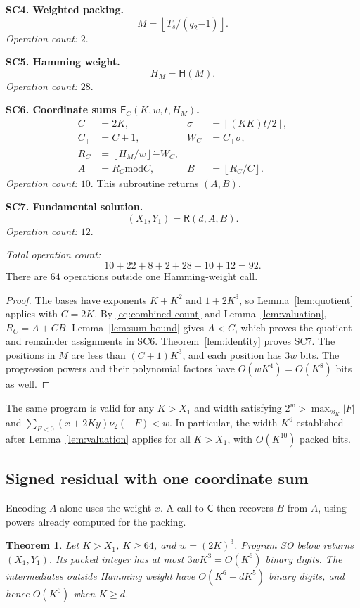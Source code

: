 \documentclass[11pt]{article}
\newtheorem{theorem}{Theorem}
\theoremstyle{remark}
\newcommand{\tsub}{\mathbin{\dot{-}}}
\newcommand{\md}{\mathbin{\mathrm{mod}}}
\newcommand{\fl}[1]{\left\lfloor #1\right\rfloor}
\newcommand{\Recover}{\mathsf{R}}
\newcommand{\Coord}{\mathsf{C}}
\begin{document}
\textbf{SC4. Weighted packing.}
\[
  M=\fl{T_s/(q_2\tsub1)}.
\]
\emph{Operation count:} $2$.

\textbf{SC5. Hamming weight.}
\[
  H_M=\mathsf H(M).
\]
\emph{Operation count:} $28$.

\textbf{SC6. Coordinate sums $\mathsf E_C(K,w,t,H_M)$.}
\begin{align*}
  C&=2K,& \sigma&=\fl{(KK)t/2},\\
  C_+&=C+1,& W_C&=C_+\sigma,\\
  R_C&=\fl{H_M/w}\tsub W_C,\\
  A&=R_C\md C,& B&=\fl{R_C/C}.
\end{align*}
\emph{Operation count:} $10$.
This subroutine returns $(A,B)$.

\textbf{SC7. Fundamental solution.}
\[
  (X_1,Y_1)=\Recover(d,A,B).
\]
\emph{Operation count:} $12$.

\emph{Total operation count:}
\[
  10+22+8+2+28+10+12=92.
\]
There are $64$ operations outside one Hamming-weight call.

\begin{proof}
The bases have exponents $K+K^2$ and $1+2K^3$, so
Lemma~\ref{lem:quotient} applies with $C=2K$.
By \eqref{eq:combined-count} and Lemma~\ref{lem:valuation},
$R_C=A+CB$. Lemma~\ref{lem:sum-bound} gives $A<C$, which proves
the quotient and remainder assignments in SC6.
Theorem~\ref{lem:identity} proves SC7.
The positions in $M$ are less than $(C+1)K^3$, and each position has
$3w$ bits. The progression powers and their polynomial factors have
$O(wK^4)=O(K^8)$ bits as well.
\end{proof}

The same program is valid for any $K>X_1$ and width satisfying
$2^w>\max_{\mathcal B_K}|F|$ and
$\sum_{F<0}(x+2Ky)\nu_2(-F)<w$.
In particular, the width $K^6$ established after
Lemma~\ref{lem:valuation} applies for all $K>X_1$, with
$O(K^{10})$ packed bits.

\subsection{Signed residual with one coordinate sum}\label{sec:so}

Encoding $A$ alone uses the weight $x$. A call to $\Coord$ then
recovers $B$ from $A$, using powers already computed for the packing.

\begin{theorem}\label{thm:so}
Let $K>X_1$, $K\ge64$, and $w=(2K)^3$.
Program SO below returns $(X_1,Y_1)$.
Its packed integer has at most $3wK^3=O(K^6)$ binary digits.
The intermediates outside Hamming weight have
$O(K^6+dK^5)$ binary digits, and hence $O(K^6)$ when $K\ge d$.
\end{theorem}
\end{document}
